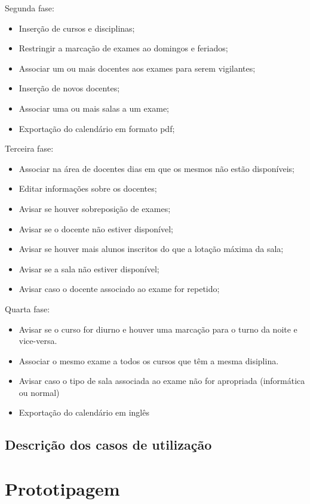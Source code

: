 \documentclass[11pt, twoside]{report}
\begin{document}
	Segunda fase:
	\begin{itemize}
		\item Inserção de cursos e disciplinas;
		\item Restringir a marcação de exames ao domingos e feriados;
		\item Associar um ou mais docentes aos exames para serem vigilantes;
		\item Inserção de novos docentes;
		\item Associar uma ou mais salas a um exame;
		\item Exportação do calendário em formato pdf;
	\end{itemize}


	Terceira fase:
	\begin{itemize}
		\item Associar na área de docentes dias em que os mesmos não estão disponíveis;
		\item Editar informações sobre os docentes;
		\item Avisar se houver sobreposição de exames;
		\item Avisar se o docente não estiver disponível;
		\item Avisar se houver mais alunos inscritos do que a lotação máxima da sala;
		\item Avisar se a sala não estiver disponível;
		\item Avisar caso o docente associado ao exame for repetido;
	\end{itemize}
	
	Quarta fase:
	\begin{itemize}
		\item Avisar se o curso for diurno e houver uma marcação para o turno da noite e vice-versa.
		\item Associar o mesmo exame a todos os cursos que têm a mesma disiplina.
		\item Avisar caso o tipo de sala associada ao exame não for apropriada (informática ou normal)
		\item Exportação do calendário em inglês
	\end{itemize}

	
	\section{Descrição dos casos de utilização}
	
	\chapter{Prototipagem}
\end{document}
